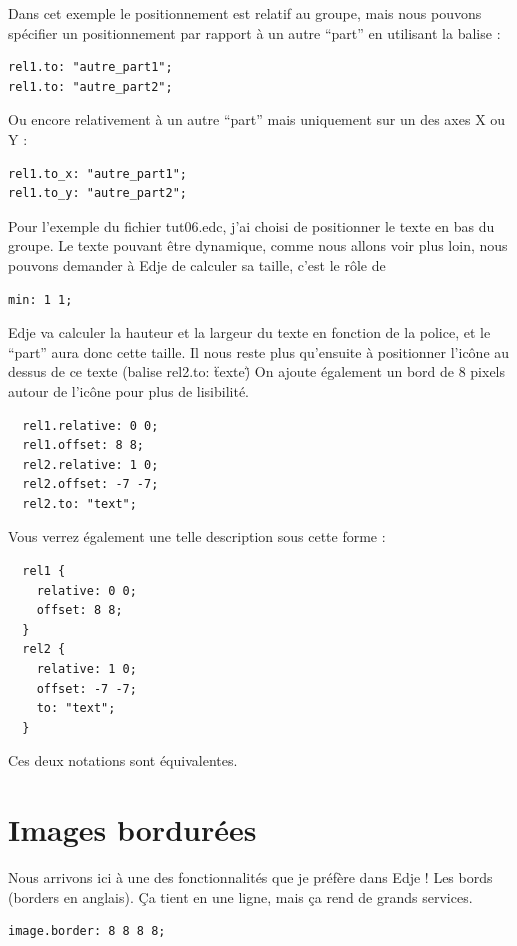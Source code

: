 \documentclass[a4paper]{efr}
\begin{document}
Dans cet exemple le positionnement est relatif au groupe, mais nous pouvons
spécifier un positionnement par rapport à un autre ``part'' en utilisant la balise :

\begin{lstlisting}
rel1.to: "autre_part1";
rel1.to: "autre_part2";
\end{lstlisting}

Ou encore relativement à un autre ``part'' mais uniquement sur un des axes X ou Y :
\begin{lstlisting}
rel1.to_x: "autre_part1";
rel1.to_y: "autre_part2";
\end{lstlisting}


Pour l'exemple du fichier tut06.edc, j'ai choisi de positionner le texte en bas
du groupe. Le texte pouvant être dynamique, comme nous allons voir plus loin,
nous pouvons demander à Edje de calculer sa taille, c'est le rôle de
\begin{lstlisting}
min: 1 1;
\end{lstlisting}

Edje va calculer la hauteur et la largeur du texte en fonction de la police,
et le ``part'' aura donc cette taille. Il nous reste plus qu'ensuite à positionner
l'icône au dessus de ce texte (balise rel2.to: \"texte\")
On ajoute également un bord de 8 pixels autour de l'icône pour plus de
lisibilité.
\begin{lstlisting}
  rel1.relative: 0 0;
  rel1.offset: 8 8;
  rel2.relative: 1 0;
  rel2.offset: -7 -7;
  rel2.to: "text";
\end{lstlisting}

Vous verrez également une telle description sous cette forme :
\begin{lstlisting}
  rel1 {
    relative: 0 0;
    offset: 8 8;
  }
  rel2 {
    relative: 1 0;
    offset: -7 -7;
    to: "text";
  }
\end{lstlisting}

Ces deux notations sont équivalentes.

\section{Images bordurées}

Nous arrivons ici à une des fonctionnalités que je préfère dans Edje ! Les
bords (borders en anglais). Ça tient en une ligne, mais ça rend de grands
services.

\begin{lstlisting}
image.border: 8 8 8 8;
\end{lstlisting}
\end{document}
